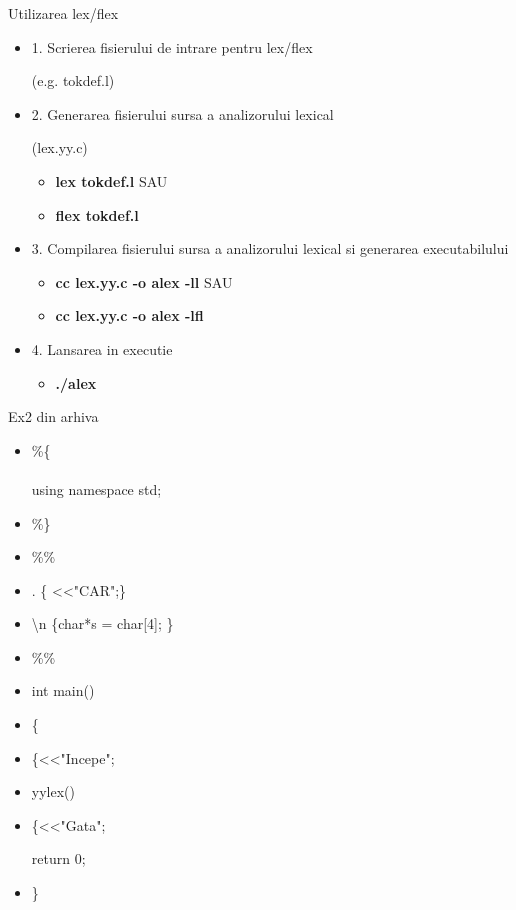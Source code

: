 \documentclass[pdf]{beamer}
\begin{document}
\begin{frame}{Utilizarea lex/flex}
	\begin{itemize}
	\item
	1. Scrierea fisierului de intrare pentru lex/flex 
	
	(e.g. tokdef.l)
	\item
	2. Generarea fisierului sursa a analizorului lexical
	
	(lex.yy.c)
	
		\begin{itemize}
		\item
		\textbf{lex tokdef.l} \color{red} { SAU}
		\item
		\textbf{flex tokdef.l}
		\end{itemize}

	\item		
	3. Compilarea fisierului sursa a analizorului lexical si generarea executabilului

		\begin{itemize}
		\item
		\textbf{cc lex.yy.c -o alex -ll} \color{red} { SAU}
		\item
		\textbf{cc lex.yy.c -o alex -lfl}
		\end{itemize}
	
	\item	
	4. Lansarea in executie
		\begin{itemize}
		\item
		\color{red} {\textbf{./alex}}
		\end{itemize}
	\end{itemize}
\end{frame}



\begin{frame}{Ex2 din arhiva}
\begin{itemize}

\item[]
\%\{ \\
\color{red}{\#include<iostream>} \\
using namespace std;
\color{black}
\item[]
\%\} \\
\item[]
\%\%
\item[]
. \{ \color{red}{cout}\color{black} <<"CAR";\}
\item[]
\textbackslash n \{char*s = \color{red}{new }\color{black} char[4]; \} \\
\item[]
\%\%
\item[]
int main()
\item[]
\{
\item[]
\color{red}{cout}\color{black} \{<<"Incepe";
\item[]
yylex()
\item[]
\color{red}{cout}\color{black} \{<<"Gata";

return 0;
\item[]
\}

\end{itemize}
\end{frame}
\end{document}
